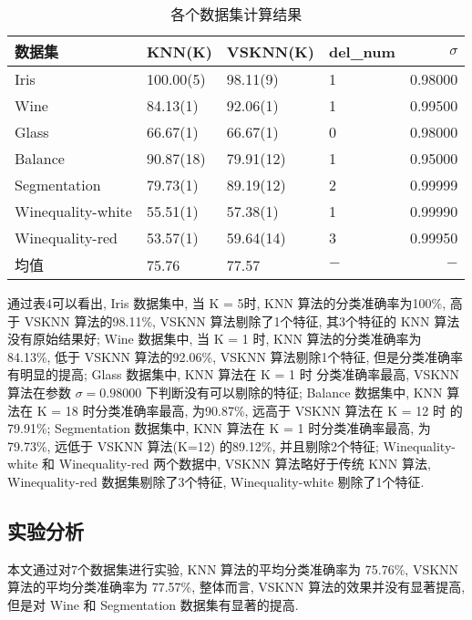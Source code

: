 \documentclass[11pt]{article}
\numberwithin{equation}{section}
\begin{document}
\begin{table}[H]
  \centering 
    \caption{各个数据集计算结果}\label{结果}
  \begin{tabular}{llllr}
\hline
数据集 & KNN(K) & VSKNN(K) & del\_num & $\sigma$ \\
 \hline
Iris & 100.00(5) & 98.11(9) & 1 & 0.98000 \\
Wine & 84.13(1) & 92.06(1) & 1 & 0.99500 \\
Glass & 66.67(1) & 66.67(1) & 0 & 0.98000 \\
Balance & 90.87(18) & 79.91(12) & 1 & 0.95000 \\
Segmentation & 79.73(1) & 89.19(12) & 2 & 0.99999 \\
Winequality-white & 55.51(1) & 57.38(1) & 1 & 0.99990 \\
Winequality-red & 53.57(1) & 59.64(14) & 3 & 0.99950 \\
\hline
均值 & 75.76 & 77.57 & $-$ & $-$ \\
\hline
\end{tabular}
\end{table}
通过表4可以看出, Iris 数据集中, 当 K = 5时, KNN 算法的分类准确率为100\%,
高于 VSKNN 算法的98.11\%, VSKNN 算法剔除了1个特征, 其3个特征的 KNN 算法没有原始结果好;
Wine 数据集中, 当 K = 1 时, KNN 算法的分类准确率为 84.13\%, 低于 VSKNN 算法的92.06\%,
VSKNN 算法剔除1个特征, 但是分类准确率有明显的提高; Glass 数据集中, KNN 算法在 K = 1 时
分类准确率最高, VSKNN 算法在参数 $\sigma = 0.98000$ 下判断没有可以剔除的特征;
Balance 数据集中, KNN 算法在 K = 18 时分类准确率最高, 为90.87\%, 远高于 VSKNN 算法在 K = 12 时
的79.91\%; Segmentation 数据集中, KNN 算法在 K = 1 时分类准确率最高, 为79.73\%, 远低于 VSKNN 算法(K=12)
的89.12\%, 并且剔除2个特征; Winequality-white 和 Winequality-red 两个数据中, VSKNN 算法略好于传统 KNN 算法, 
Winequality-red 数据集剔除了3个特征, Winequality-white 剔除了1个特征.


\subsection{实验分析}
本文通过对7个数据集进行实验, KNN 算法的平均分类准确率为 75.76\%, VSKNN 算法的平均分类准确率为 77.57\%, 整体而言, VSKNN 算法的效果并没有显著提高, 但是对 Wine 和 Segmentation 数据集有显著的提高.

\end{document}
